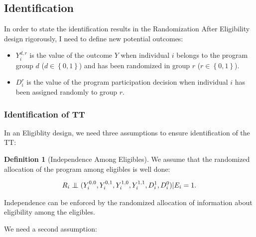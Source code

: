 \documentclass[
]{book}
\providecommand{\tightlist}{%
  \setlength{\itemsep}{0pt}\setlength{\parskip}{0pt}}
\newcommand\Ind{\protect\mathpalette{\protect\independenT}{\perp}}
\def\independenT#1#2{\mathrel{\setbox0\hbox{$#1#2$}\copy0\kern-\wd0\mkern4mu\box0}}
\theoremstyle{definition}
\newtheorem{definition}{Definition}[chapter]
\theoremstyle{definition}
\theoremstyle{definition}
\theoremstyle{definition}
\theoremstyle{remark}
\begin{document}
\hypertarget{identification-2}{%
\subsection{Identification}\label{identification-2}}

In order to state the identification results in the Randomization After Eligibility design rigorously, I need to define new potential outcomes:

\begin{itemize}
\tightlist
\item
  \(Y_i^{d,r}\) is the value of the outcome \(Y\) when individual \(i\) belongs to the program group \(d\) (\(d\in\left\{0,1\right\}\)) and has been randomized in group \(r\) (\(r\in\left\{0,1\right\}\)).
\item
  \(D_i^r\) is the value of the program participation decision when individual \(i\) has been assigned randomly to group \(r\).
\end{itemize}

\hypertarget{identification-of-tt}{%
\subsubsection{Identification of TT}\label{identification-of-tt}}

In an Eligiblity design, we need three assumptions to ensure identification of the TT:

\begin{definition}[Independence Among Eligibles]
\protect\hypertarget{def:indelig}{}{\label{def:indelig} \iffalse (Independence Among Eligibles) \fi{} }We assume that the randomized allocation of the program among eligibles is well done:

\begin{align*}
  R_i\Ind(Y_i^{0,0},Y_i^{0,1},Y_i^{1,0},Y_i^{1,1},D_i^1,D_i^0)|E_i=1.
\end{align*}
\end{definition}

Independence can be enforced by the randomized allocation of information about eligibility among the eligibles.

We need a second assumption:
\end{document}
